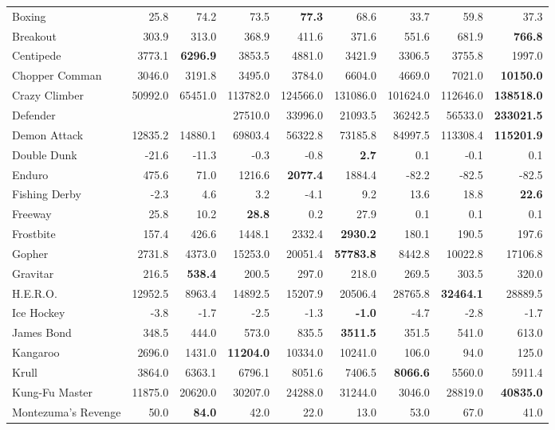 \documentclass{article} \usepackage{times}
\begin{document}
\begin{table*}[h]
\begin{scriptsize}
\begin{tabular}{lrrrrrrrr}
Boxing & 25.8 & 74.2 & 73.5 & \textbf{77.3} & 68.6 & 33.7 & 59.8 & 37.3\\
Breakout & 303.9 & 313.0 & 368.9 & 411.6 & 371.6 & 551.6 & 681.9 & \textbf{766.8}\\
Centipede & 3773.1 & \textbf{6296.9} & 3853.5 & 4881.0 & 3421.9 & 3306.5 & 3755.8 & 1997.0\\
Chopper Comman & 3046.0 & 3191.8 & 3495.0 & 3784.0 & 6604.0 & 4669.0 & 7021.0 & \textbf{10150.0}\\
Crazy Climber & 50992.0 & 65451.0 & 113782.0 & 124566.0 & 131086.0 & 101624.0 & 112646.0 & \textbf{138518.0}\\
Defender &  &  & 27510.0 & 33996.0 & 21093.5 & 36242.5 & 56533.0 & \textbf{233021.5}\\
Demon Attack & 12835.2 & 14880.1 & 69803.4 & 56322.8 & 73185.8 & 84997.5 & 113308.4 & \textbf{115201.9}\\
Double Dunk & -21.6 & -11.3 & -0.3 & -0.8 & \textbf{2.7} & 0.1 & -0.1 & 0.1\\
Enduro & 475.6 & 71.0 & 1216.6 & \textbf{2077.4} & 1884.4 & -82.2 & -82.5 & -82.5\\
Fishing Derby & -2.3 & 4.6 & 3.2 & -4.1 & 9.2 & 13.6 & 18.8 & \textbf{22.6}\\
Freeway & 25.8 & 10.2 & \textbf{28.8} & 0.2 & 27.9 & 0.1 & 0.1 & 0.1\\
Frostbite & 157.4 & 426.6 & 1448.1 & 2332.4 & \textbf{2930.2} & 180.1 & 190.5 & 197.6\\
Gopher & 2731.8 & 4373.0 & 15253.0 & 20051.4 & \textbf{57783.8} & 8442.8 & 10022.8 & 17106.8\\
Gravitar & 216.5 & \textbf{538.4} & 200.5 & 297.0 & 218.0 & 269.5 & 303.5 & 320.0\\
H.E.R.O. & 12952.5 & 8963.4 & 14892.5 & 15207.9 & 20506.4 & 28765.8 & \textbf{32464.1} & 28889.5\\
Ice Hockey & -3.8 & -1.7 & -2.5 & -1.3 & \textbf{-1.0} & -4.7 & -2.8 & -1.7\\
James Bond & 348.5 & 444.0 & 573.0 & 835.5 & \textbf{3511.5} & 351.5 & 541.0 & 613.0\\
Kangaroo & 2696.0 & 1431.0 & \textbf{11204.0} & 10334.0 & 10241.0 & 106.0 & 94.0 & 125.0\\
Krull & 3864.0 & 6363.1 & 6796.1 & 8051.6 & 7406.5 & \textbf{8066.6} & 5560.0 & 5911.4\\
Kung-Fu Master & 11875.0 & 20620.0 & 30207.0 & 24288.0 & 31244.0 & 3046.0 & 28819.0 & \textbf{40835.0}\\
Montezuma's Revenge & 50.0 & \textbf{84.0} & 42.0 & 22.0 & 13.0 & 53.0 & 67.0 & 41.0\\

\end{tabular}
\end{scriptsize}
\end{table*}
\end{document}
